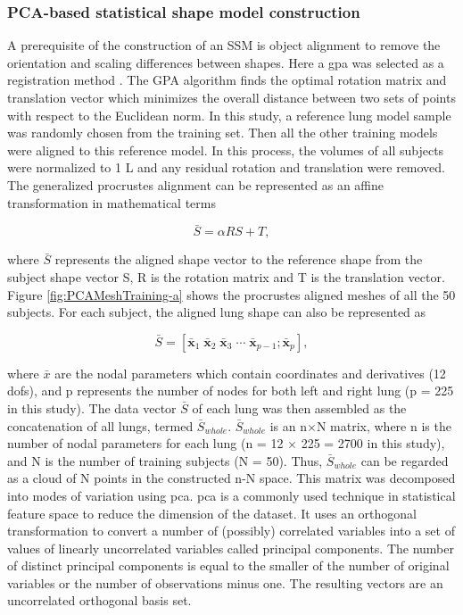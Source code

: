 {%
\subsubsection{PCA-based statistical shape model construction} \label{SSMConstruction}

A prerequisite of the construction of an SSM is object alignment to remove the orientation and scaling differences between shapes. Here a \gls{gpa} was selected as a registration method \citep{dryden1998statistical,rohlf1999shape}. The GPA algorithm finds the optimal rotation matrix and translation vector which minimizes the overall distance between two sets of points with respect to the Euclidean norm. In this study, a reference lung model sample was randomly chosen from the training set. Then all the other training models were aligned to this reference model. In this process, the volumes of all subjects were normalized to 1 L and any residual rotation and translation were removed. The generalized procrustes alignment can be represented as an affine transformation in mathematical terms

\begin{equation}
 \label{eq:PCAConstruction1}
 \bar{S} = \alpha RS + T,
\end{equation}

\noindent where $\bar{S}$ represents the aligned shape vector to the reference shape from the subject shape vector S, R is the rotation matrix and T is the translation vector. Figure \ref{fig:PCAMeshTraining-a} shows the procrustes aligned meshes of all the 50 subjects. For each subject, the aligned lung shape can also be represented as 

\begin{equation}
 \label{eq:PCAConstruction2}
 \bar{S} = [\mathbf{\bar{x}}_1 \; \mathbf{\bar{x}}_2 \; \mathbf{\bar{x}}_3 \; \cdots \; \mathbf{\bar{x}}_{p-1}; \mathbf{\bar{x}}_p],
\end{equation}

\noindent where $\bar{x}$ are the nodal parameters which contain coordinates and derivatives (12 \gls{dof}s), and p represents the number of nodes for both left and right lung (p = 225 in this study). The data vector $\bar{S}$ of each lung was then assembled as the concatenation of all lungs, termed $\bar{S}_{whole}$. $\bar{S}_{whole}$ is an n$\times$N matrix, where n is the number of nodal parameters for each lung (n = 12 $\times$ 225 = 2700 in this study), and N is the number of training subjects (N = 50). Thus, $\bar{S}_{whole}$ can be regarded as a cloud of N points in the constructed n-N space. This matrix was decomposed into modes of variation using \gls{pca}. \gls{pca} is a commonly used technique in statistical feature space to reduce the dimension of the dataset. It uses an orthogonal transformation to convert a number of (possibly) correlated variables into a set of values of linearly uncorrelated variables called principal components. The number of distinct principal components is equal to the smaller of the number of original variables or the number of observations minus one. The resulting vectors are an uncorrelated orthogonal basis set. 

}

